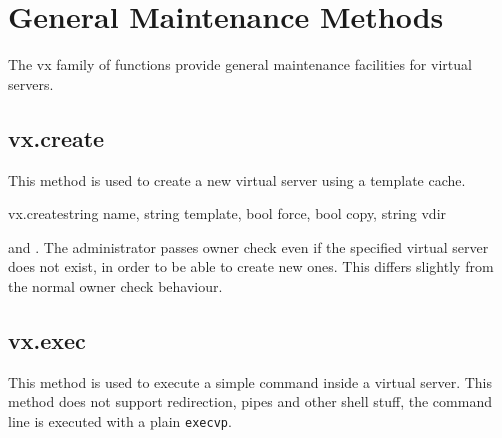 \chapter{General Maintenance Methods}
\label{ch:rpcref:vx}

The vx family of functions provide general maintenance facilities for virtual
servers.


\section{vx.create}

This method is used to create a new virtual server using a template cache.

\begin{rpcsynopsis}{vx.create}{string name, string template,
	bool force, bool copy, string vdir}
\end{rpcsynopsis}

\begin{rpcaccess}
 and \rpcownerchecks. The administrator passes owner
check even if the specified virtual server does not exist, in order to be able
to create new ones. This differs slightly from the normal owner check
behaviour.
\end{rpcaccess}

\rpcreturnnil

\begin{rpcerrors}
\end{rpcerrors}


\section{vx.exec}

This method is used to execute a simple command inside a virtual server. This
method does not support redirection, pipes and other shell stuff, the command
line is executed with a plain \texttt{execvp}.

